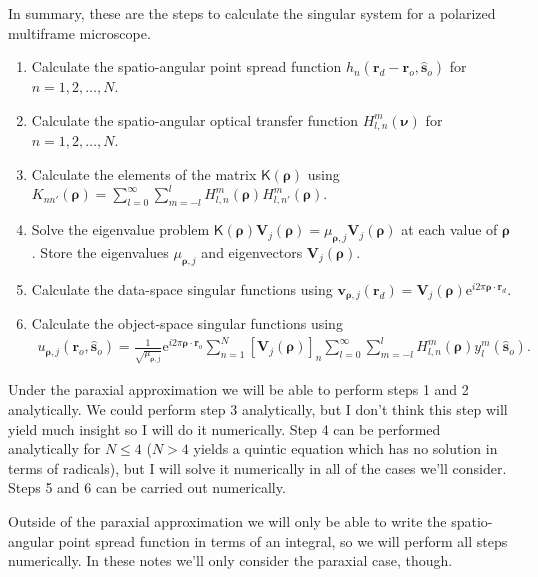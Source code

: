 \documentclass[11pt]{article}
\newcommand{\me}{\mathrm{e}}
\providecommand{\mb}[1]{\mathbf{#1}}
\providecommand{\ro}[1]{\mathbf{\mathbf{r}}_o}
\providecommand{\so}[1]{\mathbf{\hat{s}}_o}
\providecommand{\rd}[1]{\mathbf{r}_d}
\providecommand{\mbb}[1]{\mathbb{#1}}
\providecommand{\bs}[1]{\boldsymbol{#1}}
\begin{document}
In summary, these are the steps to calculate the singular system for a
polarized multiframe microscope.
\begin{enumerate}
\item Calculate the spatio-angular point spread function
  $h_n(\rd{} - \ro{}, \so{})$ for $n = 1, 2, \ldots, N$.
\item Calculate the spatio-angular optical transfer function
  $H_{l,n}^{m}(\bs{\nu})$ for $n = 1, 2, \ldots, N$.
\item Calculate the elements of the matrix $\mathsf{K}(\bs{\rho})$ using
  $K_{nn'}(\bs{\rho}) = \sum_{l=0}^{\infty}\sum_{m=-l}^l H_{l,n}^m(\bs{\rho}) H_{l,n'}^m(\bs{\rho})$.
\item Solve the eigenvalue problem
  $\mathsf{K}(\bs{\rho})\mb{V}_j(\bs{\rho}) = \mu_{\bs{\rho}, j}\mb{V}_j(\bs{\rho})$ at each value of $\bs{\rho}$. Store the eigenvalues $\mu_{\bs{\rho}, j}$ and eigenvectors $\mb{V}_j(\bs{\rho})$. 
\item Calculate the data-space singular functions using $\mb{v}_{\bs{\rho},j}(\rd{}) = \mb{V}_j(\bs{\rho})\me{}^{i 2\pi \bs{\rho}\cdot\rd{}}$.
\item Calculate the object-space singular functions using
  \begin{align}
   u_{\bs{\rho},j}(\ro{}, \so{}) = \frac{1}{\sqrt{\mu_{\bs{\rho},j}}}\me{}^{i2\pi\bs{\rho}\cdot\ro{}}\sum_{n=1}^N[\mb{V}_j(\bs{\rho})]_n \sum_{l=0}^{\infty}\sum_{m=-l}^l H_{l,n}^m(\bs{\rho})y_l^m(\so{}). 
  \end{align}
\end{enumerate}

Under the paraxial approximation we will be able to perform steps 1 and 2
analytically. We could perform step 3 analytically, but I don't think this step
will yield much insight so I will do it numerically. Step 4 can be performed
analytically for $N \leq 4$ ($N > 4$ yields a quintic equation which has no
solution in terms of radicals), but I will solve it numerically in all of the
cases we'll consider. Steps 5 and 6 can be carried out numerically.

Outside of the paraxial approximation we will only be able to write the
spatio-angular point spread function in terms of an integral, so we will
perform all steps numerically. In these notes we'll only consider the paraxial
case, though.

\end{document}
